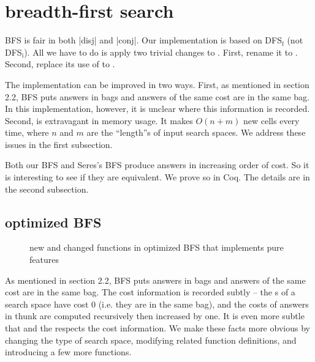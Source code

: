 \documentclass[format=acmlarge, review=true, authordraft=true]{acmart}
\begin{document}
\section{breadth-first search}

BFS is fair in both \scheme|disj| and \scheme|conj|. Our implementation is based on 
DFS$_\textrm{f}$ (not DFS$_\textrm{i}$). All we have to do is apply two trivial changes to 
. First, rename it to . 
Second, replace its use of  to . 

The implementation can be improved in two ways. First, as mentioned in 
section 2.2, BFS puts answers in bags and answers of the same cost are in the 
same bag. In this implementation, however, it is unclear where this information 
is recorded. Second, 
 is extravagant in memory usage. It makes 
$O(n+m)$ new  cells every time, where $n$ and $m$ are the 
``length''s of input search spaces. We address these issues in the first 
subsection.

Both our BFS and Seres's BFS \citet{seres1999algebra} produce answers in 
increasing order of cost. So it is interesting to see if they are equivalent. 
We prove so in Coq. The details are in the second subsection.

\subsection{optimized BFS}

\begin{figure}
	\caption{new and changed functions in optimized BFS that implements pure 
	features}
	\label{BFS-opt}
\end{figure}


As mentioned in section 2.2, BFS puts answers in bags and answers of the 
same cost are in the same bag. The cost
information is recorded subtly -- the s of a search space have cost 
0 (i.e. they are in the same bag), and the costs of answers in thunk are 
computed recursively then increased by one. It is even more subtle that
 and the  respects the cost 
information. We make these facts more obvious by changing the type of search 
space, modifying related function definitions, and introducing a few more 
functions.
\end{document}

